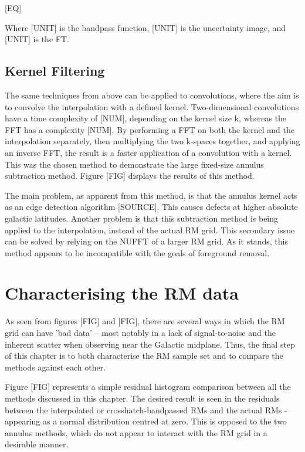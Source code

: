 [EQ]


Where [UNIT] is the bandpass function, [UNIT] is the uncertainty image, and [UNIT] is the FT.

\subsection{Kernel Filtering}
\label{ssec:kernel}

The same techniques from above can be applied to convolutions, where the aim is to convolve the interpolation with a defined kernel. Two-dimensional convolutions have a time complexity of [NUM], depending on the kernel size k, whereas the FFT has a complexity [NUM]. By performing a FFT on both the kernel and the interpolation separately, then multiplying the two k-spaces together, and applying an inverse FFT, the result is a faster application of a convolution with a kernel. This was the chosen method to demonstrate the large fixed-size annulus subtraction method. Figure [FIG] displays the results of this method.


The main problem, as apparent from this method, is that the annulus kernel acts as an edge detection algorithm [SOURCE]. This causes defects at higher absolute galactic latitudes. Another problem is that this subtraction method is being applied to the interpolation, instead of the actual RM grid. This secondary issue can be solved by relying on the NUFFT of a larger RM grid. As it stands, this method appears to be incompatible with the goals of foreground removal.

\section{Characterising the RM data}
\label{sec:charm}

As seen from figures [FIG] and [FIG], there are several ways in which the RM grid can have 'bad data' – most notably in a lack of signal-to-noise and the inherent scatter when observing near the Galactic midplane. Thus, the final step of this chapter is to both characterise the RM sample set and to compare the methods against each other.


Figure [FIG] represents a simple residual histogram comparison between all the methods discussed in this chapter. The desired result is seen in the residuals between the interpolated or crosshatch-bandpassed RMs and the actual RMs - appearing as a normal distribution centred at zero.  This is opposed to the two annulus methods, which do not appear to interact with the RM grid in a desirable manner.


